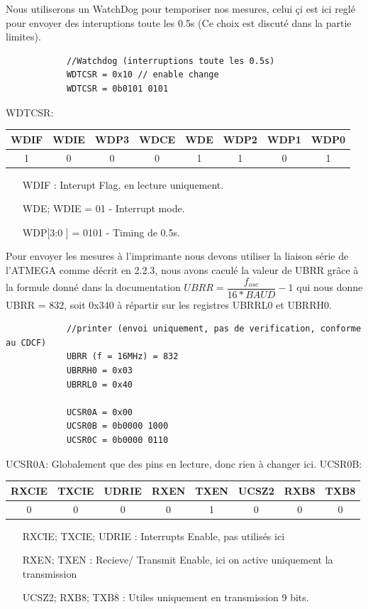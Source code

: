 \documentclass[a4paper, 12pt]{article}
\begin{document}
		Nous utiliserons un WatchDog pour temporiser nos mesures, celui çi est ici reglé pour envoyer des interuptions toute les 0.5s (Ce choix est discuté dans la partie limites).
		\begin{lstlisting}
			//Watchdog (interruptions toute les 0.5s)
			WDTCSR = 0x10 // enable change
			WDTCSR = 0b0101 0101
		\end{lstlisting}
		WDTCSR:
		\begin{center}
			\begin{tabular}{|c|c|c|c|c|c|c|c|}
				\hline
				WDIF & WDIE & WDP3 & WDCE & WDE & WDP2 & WDP1 & WDP0\\
				\hline
				1 & 0 & 0 & 0 & 1 & 1 & 0 & 1\\
				\hline
			\end{tabular}
		\end{center}
		\begin{itemize}
			\item[WDIF] : Interupt Flag, en lecture uniquement.
			\item[WDE; WDIE] = 01 - Interrupt mode.
			\item[WDP[3:0]] = 0101 - Timing de 0.5s.
		\end{itemize}

		Pour envoyer les mesures à l'imprimante nous devons utiliser la liaison série de l'ATMEGA comme décrit en 2.2.3, nous avons caculé la valeur de UBRR grâce à la formule donné dans la documentation $UBRR = \dfrac{f_{osc}}{16*BAUD} - 1$ qui nous donne UBRR = 832, soit 0x340 à répartir sur les registres UBRRL0 et UBRRH0.
		\begin{lstlisting}
			//printer (envoi uniquement, pas de verification, conforme au CDCF)
			UBRR (f = 16MHz) = 832
			UBRRH0 = 0x03
			UBRRL0 = 0x40
			
			UCSR0A = 0x00
			UCSR0B = 0b0000 1000
			UCSR0C = 0b0000 0110			
		\end{lstlisting}
		UCSR0A:
			Globalement que des pins en lecture, donc rien à changer ici.	
		UCSR0B:
		\begin{center}
			\begin{tabular}{|c|c|c|c|c|c|c|c|}
				\hline
				RXCIE & TXCIE & UDRIE & RXEN & TXEN & UCSZ2 & RXB8 & TXB8\\
				\hline
				0 & 0 & 0 & 0 & 1 & 0 & 0 & 0\\
				\hline
			\end{tabular}
		\end{center}
		\begin{itemize}
			\item[RXCIE; TXCIE; UDRIE] : Interrupts Enable, pas utilisés ici
			\item[RXEN; TXEN] : Recieve/ Transmit Enable, ici on active uniquement la transmission
			\item[UCSZ2; RXB8; TXB8] : Utiles uniquement en transmission 9 bits.
		\end{itemize}
\end{document}
